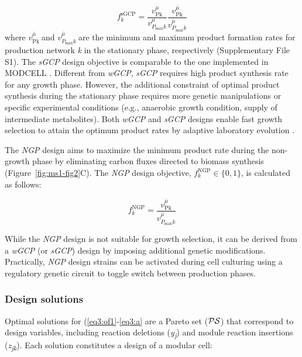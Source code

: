 \begin{equation}
    f_{k}^{\text{sGCP}} = \frac{v_{\text{Pk}}^{\mu}}{v_{P_{\max}k}^{\mu}} \frac{v_{\text{Pk}}^{\overline{\mu}}}{v_{P_{\max}k}^{\overline{\mu}}} \label{eq3:sgcp}
\end{equation}
\noindent where \(v_{\text{Pk}}^{\overline{\mu}}\ \)and \(v_{P_{\max}k}^{\overline{\mu}}\ \)are the minimum and maximum product formation rates for production network \emph{k} in the stationary phase, respectively (Supplementary File S1).
The \emph{sGCP} design objective is comparable to the one implemented in MODCELL \citep{trinh2015}.
Different from \emph{wGCP}, \emph{sGCP} requires high product synthesis rate for any growth phase.
However, the additional constraint of optimal product synthesis during the stationary phase requires more genetic manipulations or specific experimental conditions (e.g., anaerobic growth condition, supply of intermediate metabolites).
Both \emph{wGCP} and \emph{sGCP} designs enable fast growth selection to attain the optimum product rates by adaptive laboratory evolution \citep{fong2005, trinh2009b}.

The \emph{NGP} design aims to maximize the minimum product rate during the non-growth phase by eliminating carbon fluxes directed to biomass synthesis (Figure~\ref{fig:ms1-fig2}C).
The \emph{NGP} design objective, $f_{k}^{\text{NGP}}\in \{0, 1\}$, is calculated as follows:

\begin{equation}
    f_{k}^{\text{NGP}} = \frac{v_{\text{Pk}}^{\overline{\mu}}}{v_{P_{\max}k}^{\overline{\mu}}} \label{eq3:ngp}
\end{equation}

While the \emph{NGP} design is not suitable for growth selection, it can be derived from a \emph{wGCP} (or \emph{sGCP}) design by imposing additional genetic modifications.
Practically, \emph{NGP} design strains can be activated during cell culturing using a regulatory genetic circuit to toggle switch between production phases.

\subsubsection{Design solutions}
Optimal solutions for (\ref{eq3:of1}-\ref{eq3:a} are a Pareto set
($\mathcal{PS}$) that correspond to design variables, including
reaction deletions (\emph{y\textsubscript{j}}) and module reaction
insertions (\emph{z\textsubscript{jk}}). Each solution constitutes a
design of a modular cell:


